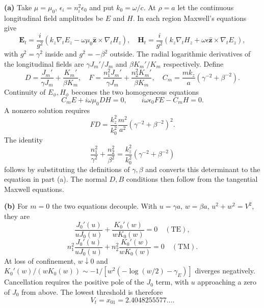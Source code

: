 \medskip\noindent\textbf{(a)} Take $\mu=\mu_0$, $\epsilon_i=n_i^2\epsilon_0$ and put
$k_0=\omega/c$.  At $\rho=a$ let the continuous longitudinal
field amplitudes be $E$ and $H$.  In each region Maxwell's equations
give
\[
\mathbf E_t=\frac{i}{g^2}
 (k_z\nabla_tE_z-\omega\mu_0\widehat{\mathbf z}\times\nabla_tH_z),
\quad
\mathbf H_t=\frac{i}{g^2}
 (k_z\nabla_tH_z+\omega\epsilon\widehat{\mathbf z}\times\nabla_tE_z),
\]
with $g^2=\gamma^2$ inside and $g^2=-\beta^2$ outside.
The radial logarithmic derivatives of the longitudinal fields are
$\gamma J_m'/J_m$ and $\beta K_m'/K_m$ respectively.  Define
\[
D=\frac{J_m'}{\gamma J_m}+\frac{K_m'}{\beta K_m},\quad
F=\frac{n_1^2J_m'}{\gamma J_m}+\frac{n_2^2K_m'}{\beta K_m},\quad
C_m=\frac{mk_z}{a}(\gamma^{-2}+\beta^{-2}).
\]
Continuity of $E_\phi,H_\phi$ becomes the two homogeneous equations
\[
C_m E+i\omega\mu_0D H=0,\qquad
 i\omega\epsilon_0F E-C_m H=0.
\]
A nonzero solution requires
\[
FD=\frac{k_z^2}{k_0^2}\frac{m^2}{a^2}
 (\gamma^{-2}+\beta^{-2})^2.
\]
The identity
\[
\frac{n_1^2}{\gamma^2}+\frac{n_2^2}{\beta^2}
=\frac{k_z^2}{k_0^2}(\gamma^{-2}+\beta^{-2})
\]
follows by substituting the definitions of $\gamma,\beta$ and
converts this determinant to the equation in part (a).  The normal
$D,B$ conditions then follow from the tangential Maxwell equations.

\medskip\noindent\textbf{(b)} For $m=0$ the two equations decouple.  With $u=\gamma a$,
$w=\beta a$, $u^2+w^2=V^2$, they are
\[
\boxed{\frac{J_0'(u)}{uJ_0(u)}+
 \frac{K_0'(w)}{wK_0(w)}=0\quad(\mathrm{TE}),}
\]
\[
\boxed{n_1^2\frac{J_0'(u)}{uJ_0(u)}+
 n_2^2\frac{K_0'(w)}{wK_0(w)}=0\quad(\mathrm{TM}).}
\]
At loss of confinement, $w\downarrow0$ and
$K_0'(w)/(wK_0(w))\sim-1/[w^2(-\log(w/2)-\gamma_E)]$
diverges negatively.  Cancellation requires the positive pole of
the $J_0$ term, with $u$ approaching a zero of $J_0$ from above.
The lowest threshold is therefore
\[
\boxed{V_t=x_{01}=2.4048255577\ldots .}
\]

